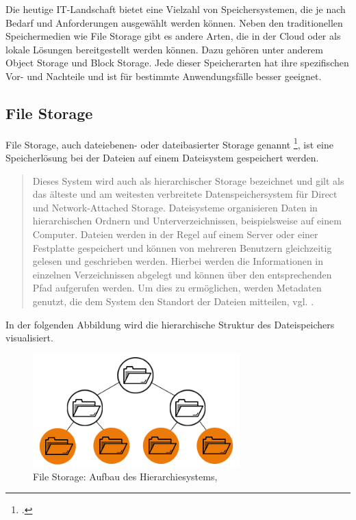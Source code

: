 Die heutige IT-Landschaft bietet eine Vielzahl von Speichersystemen, die je nach Bedarf und Anforderungen ausgewählt werden können. Neben den traditionellen Speichermedien wie File Storage gibt es andere Arten, die in der Cloud oder als lokale Lösungen bereitgestellt werden können. Dazu gehören unter anderem Object Storage und Block Storage. Jede dieser Speicherarten hat ihre spezifischen Vor- und Nachteile und ist für bestimmte Anwendungsfälle besser geeignet. 
 
\subsection{File Storage}

File Storage, auch dateiebenen- oder dateibasierter Storage genannt \footcite{rH-storage}, ist eine Speicherlösung bei der Dateien auf einem Dateisystem gespeichert werden. 

\begin{quote}
	Dieses System wird auch als hierarchischer Storage bezeichnet und gilt als das älteste und am weitesten verbreitete Datenspeichersystem für Direct und Network-Attached Storage. Dateisysteme organisieren Daten in hierarchischen Ordnern und Unterverzeichnissen, beispielsweise auf einem Computer. Dateien werden in der Regel auf einem Server oder einer Festplatte gespeichert und können von mehreren Benutzern gleichzeitig gelesen und geschrieben werden. Hierbei werden die Informationen in einzelnen Verzeichnissen abgelegt und können über den entsprechenden Pfad aufgerufen werden. Um dies zu ermöglichen, werden Metadaten genutzt, die dem System den Standort der Dateien mitteilen, vgl. \citeauthor{rH-storage}.
\end{quote}

In der folgenden Abbildung wird die hierarchische Struktur des Dateispeichers visualisiert.

\begin{figure}[h]
\centering
	\includegraphics[width=8cm,keepaspectratio]{Pictures/FileStorageHierarchy.png}
	\caption{File Storage: Aufbau des Hierarchiesystems, }
\end{figure}

